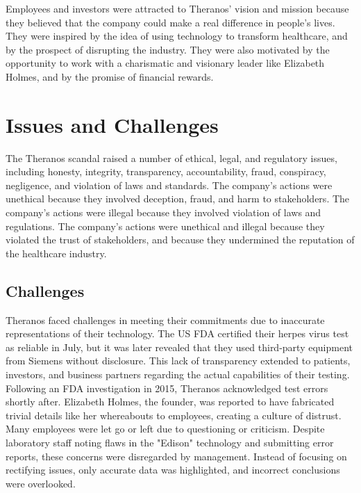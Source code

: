 \documentclass[stu]{apa7}
\begin{document}
\begin{multicols}{2}
    Employees and investors were attracted to Theranos' vision and mission
    because they believed that the company could make a real difference in
    people's lives. They were inspired by the idea of using technology to
    transform healthcare, and by the prospect of disrupting the industry. They
    were also motivated by the opportunity to work with a charismatic and
    visionary leader like Elizabeth Holmes, and by the promise of financial
    rewards. \cite{fortune}

    \section{Issues and Challenges}

    The Theranos scandal raised a number of ethical, legal, and regulatory
    issues, including honesty, integrity, transparency, accountability, fraud,
    conspiracy, negligence, and violation of laws and standards. The company's
    actions were unethical because they involved deception, fraud, and harm to
    stakeholders. The company's actions were illegal because they involved
    violation of laws and regulations. The company's actions were unethical and
    illegal because they violated the trust of stakeholders, and because they
    undermined the reputation of the healthcare industry. \cite{wsj, fortune, nyt}

    \subsection{Challenges}

    Theranos faced challenges in meeting their commitments due to inaccurate
    representations of their technology. The US FDA certified their herpes
    virus test as reliable in July, but it was later revealed that they used
    third-party equipment from Siemens without disclosure. This lack of
    transparency extended to patients, investors, and business partners
    regarding the actual capabilities of their testing. Following an FDA
    investigation in 2015, Theranos acknowledged test errors shortly after.
    Elizabeth Holmes, the founder, was reported to have fabricated trivial
    details like her whereabouts to employees, creating a culture of distrust.
    Many employees were let go or left due to questioning or criticism. Despite
    laboratory staff noting flaws in the "Edison" technology and submitting
    error reports, these concerns were disregarded by management. Instead of
    focusing on rectifying issues, only accurate data was highlighted, and
    incorrect conclusions were overlooked. \cite{wsj}


\end{multicols}
\end{document}
